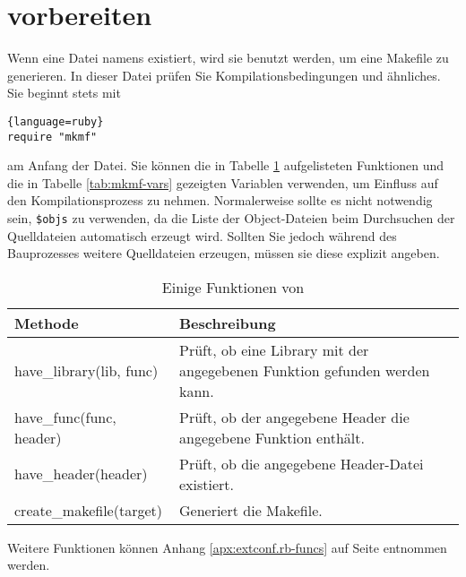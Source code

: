 \section{\protect{} vorbereiten}
\label{sec:extconf.rb}

Wenn eine Datei namens  existiert, wird sie benutzt
werden, um eine Makefile zu generieren. In dieser Datei prüfen Sie
Kompilationsbedingungen und ähnliches. Sie beginnt stets mit

\begin{lstlisting}{language=ruby}
require "mkmf"
\end{lstlisting}

\noindent am Anfang der Datei. Sie können \uA die in Tabelle
\ref{tab:mkmf-funcs} aufgelisteten Funktionen und die in Tabelle
\ref{tab:mkmf-vars} gezeigten Variablen verwenden, um Einfluss auf den
Kompilationsprozess zu nehmen. Normalerweise sollte es nicht notwendig
sein, \verb+$objs+ zu verwenden, da die Liste der Object-Dateien beim
Durchsuchen der Quelldateien automatisch erzeugt wird. Sollten Sie
jedoch während des Bauprozesses weitere Quelldateien erzeugen, müssen
sie diese explizit angeben.

\begin{table}[tbp]
  \centering
  \begin{tabularx}{\textwidth}{>{\ttfamily}lX}\raggedright
    \normalfont\bfseries Methode & \bfseries Beschreibung\\
    \hline
    have\_library(lib, func)     & Prüft, ob eine Library mit der angegebenen Funktion gefunden werden kann.\\
    have\_func(func, header)     & Prüft, ob der angegebene Header die angegebene Funktion enthält.\\
    have\_header(header)         & Prüft, ob die angegebene Header-Datei existiert.\\
    create\_makefile(target)     & Generiert die Makefile.\\
  \end{tabularx}

  \vspace{\baselineskip}

  \small Weitere Funktionen können Anhang \ref{apx:extconf.rb-funcs}
  auf Seite \pageref{apx:extconf.rb-funcs} entnommen werden.

  \caption{Einige Funktionen von }
  \label{tab:mkmf-funcs}
\end{table}

